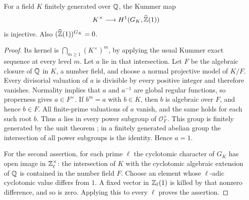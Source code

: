 \begin{lemma}\label{A6-kummer}
For a field $K$ finitely generated over ${\mathbb{Q}}$, the Kummer map
\[
 K^\times\longrightarrow H^1(G_K,\widehat{{\mathbb{Z}}}(1))
\]
is injective. Also $(\widehat{{\mathbb{Z}}}(1))^{G_K}=0$.
\end{lemma}
\begin{proof}
Its kernel is $\bigcap_{m\ge1}(K^\times)^m$, by applying the usual Kummer exact sequence at every level $m$. Let $a$ lie in that intersection. Let $F$ be the algebraic closure of ${\mathbb{Q}}$ in $K$, a number field, and choose a normal projective model of $K/F$. Every divisorial valuation of $a$ is divisible by every positive integer and therefore vanishes. Normality implies that $a$ and $a^{-1}$ are global regular functions, so properness gives $a\in F^\times$. If $b^m=a$ with $b\in K$, then $b$ is algebraic over $F$, and hence $b\in F$. All finite-prime valuations of $a$ vanish, and the same holds for each such root $b$. Thus $a$ lies in every power subgroup of $\mathcal O_F^\times$. This group is finitely generated by the unit theorem \cite[Theorem 5.1]{MilneANTA567}; in a finitely generated abelian group the intersection of all power subgroups is the identity. Hence $a=1$.

For the second assertion, for each prime $\ell$ the cyclotomic character of $G_K$ has open image in ${\mathbb{Z}}_\ell^\times$: the intersection of $K$ with the cyclotomic algebraic extension of ${\mathbb{Q}}$ is contained in the number field $F$. Choose an element whose $\ell$-adic cyclotomic value differs from $1$. A fixed vector in ${\mathbb{Z}}_\ell(1)$ is killed by that nonzero difference, and so is zero. Applying this to every $\ell$ proves the assertion.
\end{proof}

